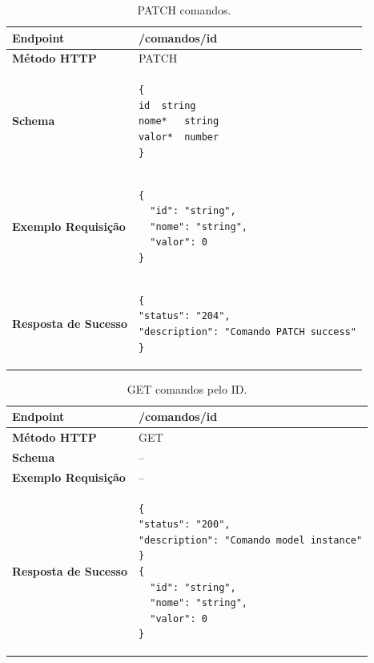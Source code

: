 \begin{apendicesenv}

\begin{table}[H]
\begin{tabular}{|l|l|}
\hline
\textbf{Endpoint}            & /comandos/{id} \\ \hline
\textbf{Método HTTP}         & PATCH \\ \hline
\textbf{Schema}              &  
\begin{lstlisting}
{
id	string
nome*	string
valor*	number
}
\end{lstlisting}\\ \hline
\textbf{Exemplo Requisição}  &  
\begin{lstlisting}
{
  "id": "string",
  "nome": "string",
  "valor": 0
}
\end{lstlisting} \\ \hline
\textbf{Resposta de Sucesso} &
\begin{lstlisting}
{
"status": "204",
"description": "Comando PATCH success"
}
\end{lstlisting}
\\ \hline
\end{tabular}
\caption{PATCH comandos.}
\label{patch_comandos}
\end{table}


\begin{table}[H]
\begin{tabular}{|l|l|}
\hline
\textbf{Endpoint}            & /comandos/{id} \\ \hline
\textbf{Método HTTP}         & GET \\ \hline
\textbf{Schema}              & -- \\ \hline
\textbf{Exemplo Requisição}  & -- \\ \hline
\textbf{Resposta de Sucesso} &
\begin{lstlisting}
{
"status": "200",
"description": "Comando model instance"
}
{
  "id": "string",
  "nome": "string",
  "valor": 0
}
\end{lstlisting}
\\ \hline
\end{tabular}
\caption{GET comandos pelo ID.}
\label{get_comandos_id}
\end{table}



\end{apendicesenv}
